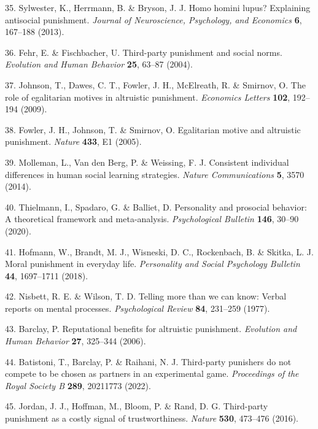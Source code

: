 \documentclass[
  english,
  man, donotrepeattitle,floatsintext]{apa6}
\newenvironment{cslreferences}%
  {}%
  {\par}
\begin{document}
\begin{cslreferences}
\leavevmode\hypertarget{ref-Sylwester2013}{}%
35. Sylwester, K., Herrmann, B. \& Bryson, J. J. Homo homini lupus? Explaining antisocial punishment. \emph{Journal of Neuroscience, Psychology, and Economics} \textbf{6}, 167--188 (2013).

\leavevmode\hypertarget{ref-Fehr2004}{}%
36. Fehr, E. \& Fischbacher, U. Third-party punishment and social norms. \emph{Evolution and Human Behavior} \textbf{25}, 63--87 (2004).

\leavevmode\hypertarget{ref-Johnson2009}{}%
37. Johnson, T., Dawes, C. T., Fowler, J. H., McElreath, R. \& Smirnov, O. The role of egalitarian motives in altruistic punishment. \emph{Economics Letters} \textbf{102}, 192--194 (2009).

\leavevmode\hypertarget{ref-Fowler2005}{}%
38. Fowler, J. H., Johnson, T. \& Smirnov, O. Egalitarian motive and altruistic punishment. \emph{Nature} \textbf{433}, E1 (2005).

\leavevmode\hypertarget{ref-Molleman2014}{}%
39. Molleman, L., Van den Berg, P. \& Weissing, F. J. Consistent individual differences in human social learning strategies. \emph{Nature Communications} \textbf{5}, 3570 (2014).

\leavevmode\hypertarget{ref-Thielmann2020}{}%
40. Thielmann, I., Spadaro, G. \& Balliet, D. Personality and prosocial behavior: A theoretical framework and meta-analysis. \emph{Psychological Bulletin} \textbf{146}, 30--90 (2020).

\leavevmode\hypertarget{ref-Hofmann2018}{}%
41. Hofmann, W., Brandt, M. J., Wisneski, D. C., Rockenbach, B. \& Skitka, L. J. Moral punishment in everyday life. \emph{Personality and Social Psychology Bulletin} \textbf{44}, 1697--1711 (2018).

\leavevmode\hypertarget{ref-Nisbett1977}{}%
42. Nisbett, R. E. \& Wilson, T. D. Telling more than we can know: Verbal reports on mental processes. \emph{Psychological Review} \textbf{84}, 231--259 (1977).

\leavevmode\hypertarget{ref-Barclay2006}{}%
43. Barclay, P. Reputational benefits for altruistic punishment. \emph{Evolution and Human Behavior} \textbf{27}, 325--344 (2006).

\leavevmode\hypertarget{ref-Batistoni2022}{}%
44. Batistoni, T., Barclay, P. \& Raihani, N. J. Third-party punishers do not compete to be chosen as partners in an experimental game. \emph{Proceedings of the Royal Society B} \textbf{289}, 20211773 (2022).

\leavevmode\hypertarget{ref-Jordan2016}{}%
45. Jordan, J. J., Hoffman, M., Bloom, P. \& Rand, D. G. Third-party punishment as a costly signal of trustworthiness. \emph{Nature} \textbf{530}, 473--476 (2016).


\end{cslreferences}
\end{document}
